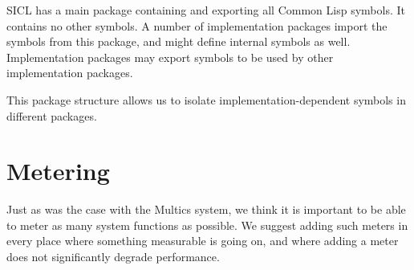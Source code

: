 \documentclass{article}
\def\sysname{SICL}
\begin{document}
{\sysname} has a main package containing and exporting all Common Lisp
symbols.  It contains no other symbols.  A number of implementation
packages import the symbols from this package, and might define
internal symbols as well.  Implementation packages may export symbols
to be used by other implementation packages.

This package structure allows us to isolate implementation-dependent
symbols in different packages.  

\section{Metering}

Just as was the case with the Multics system, we think it is important
to be able to meter as many system functions as possible.  We suggest
adding such meters in every place where something measurable is going
on, and where adding a meter does not significantly degrade
performance.  
\end{document}
